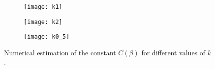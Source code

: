 \begin{figure}
	\begin{subfigure}{0.45\textwidth}
		\texttt{[image: k1]}
	\end{subfigure}
	\begin{subfigure}{0.45\textwidth}
		\texttt{[image: k2]}
	\end{subfigure}
\centering
	\begin{subfigure}{0.45\textwidth}
		\texttt{[image: k0\_5]}
	\end{subfigure}
\caption{Numerical estimation of the constant $C(\beta)$ for different values of $k$.}
\end{figure}